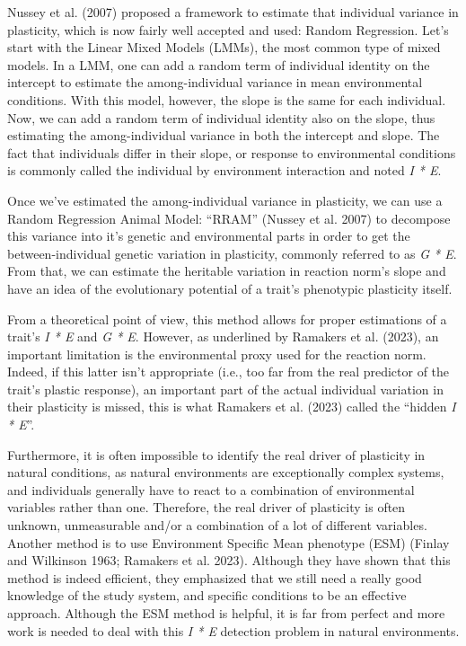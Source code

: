 \documentclass[
  12pt,
  letterpaper,
]{scrartcl}
\begin{document}
Nussey et al. (2007) proposed a framework to estimate that individual
variance in plasticity, which is now fairly well accepted and used:
Random Regression. Let's start with the Linear Mixed Models (LMMs), the
most common type of mixed models. In a LMM, one can add a random term of
individual identity on the intercept to estimate the among-individual
variance in mean environmental conditions. With this model, however, the
slope is the same for each individual. Now, we can add a random term of
individual identity also on the slope, thus estimating the
among-individual variance in both the intercept and slope. The fact that
individuals differ in their slope, or response to environmental
conditions is commonly called the individual by environment interaction
and noted \emph{I * E}.

Once we've estimated the among-individual variance in plasticity, we can
use a Random Regression Animal Model: ``RRAM'' (Nussey et al. 2007) to
decompose this variance into it's genetic and environmental parts in
order to get the between-individual genetic variation in plasticity,
commonly referred to as \emph{G * E}. From that, we can estimate the
heritable variation in reaction norm's slope and have an idea of the
evolutionary potential of a trait's phenotypic plasticity itself.

From a theoretical point of view, this method allows for proper
estimations of a trait's \emph{I * E} and \emph{G * E}. However, as
underlined by Ramakers et al. (2023), an important limitation is the
environmental proxy used for the reaction norm. Indeed, if this latter
isn't appropriate (i.e., too far from the real predictor of the trait's
plastic response), an important part of the actual individual variation
in their plasticity is missed, this is what Ramakers et al. (2023)
called the ``hidden \emph{I * E}''.

Furthermore, it is often impossible to identify the real driver of
plasticity in natural conditions, as natural environments are
exceptionally complex systems, and individuals generally have to react
to a combination of environmental variables rather than one. Therefore,
the real driver of plasticity is often unknown, unmeasurable and/or a
combination of a lot of different variables. Another method is to use
Environment Specific Mean phenotype (ESM) (Finlay and Wilkinson 1963;
Ramakers et al. 2023). Although they have shown that this method is
indeed efficient, they emphasized that we still need a really good
knowledge of the study system, and specific conditions to be an
effective approach. Although the ESM method is helpful, it is far from
perfect and more work is needed to deal with this \emph{I * E} detection
problem in natural environments.
\end{document}
